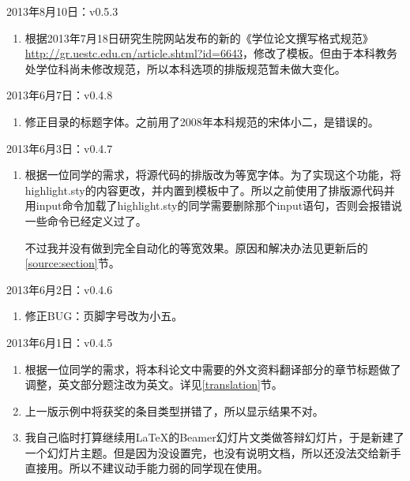 \noindent
2013年8月10日：v0.5.3
\begin{enumerate}
\item 根据2013年7月18日研究生院网站发布的新的《学位论文撰写格式规范》\url{http://gr.uestc.edu.cn/article.shtml?id=6643}，修改了模板。但由于本科教务处学位科尚未修改规范，所以本科选项的排版规范暂未做大变化。
\end{enumerate}

\noindent
2013年6月7日：v0.4.8
\begin{enumerate}
\item 修正目录的标题字体。之前用了2008年本科规范的宋体小二，是错误的。
\end{enumerate}

\noindent
2013年6月3日：v0.4.7
\begin{enumerate}
\item 根据一位同学的需求，将源代码的排版改为等宽字体。为了实现这个功能，将highlight.sty的内容更改，并内置到模板中了。所以之前使用了排版源代码并用input命令加载了highlight.sty的同学需要删除那个input语句，否则会报错说一些命令已经定义过了。

    不过我并没有做到完全自动化的等宽效果。原因和解决办法见更新后的\ref{source:section}节。
\end{enumerate}

\noindent
2013年6月2日：v0.4.6
\begin{enumerate}
\item 修正BUG：页脚字号改为小五。
\end{enumerate}

\noindent
2013年6月1日：v0.4.5
\begin{enumerate}
\item 根据一位同学的需求，将本科论文中需要的外文资料翻译部分的章节标题做了调整，英文部分题注改为英文。详见\ref{translation}节。
\item 上一版示例中将获奖的条目类型拼错了，所以显示结果不对。
\item 我自己临时打算继续用LaTeX的Beamer幻灯片文类做答辩幻灯片，于是新建了一个幻灯片主题。但是因为没设置完，也没有说明文档，所以还没法交给新手直接用。所以不建议动手能力弱的同学现在使用。
\end{enumerate}

